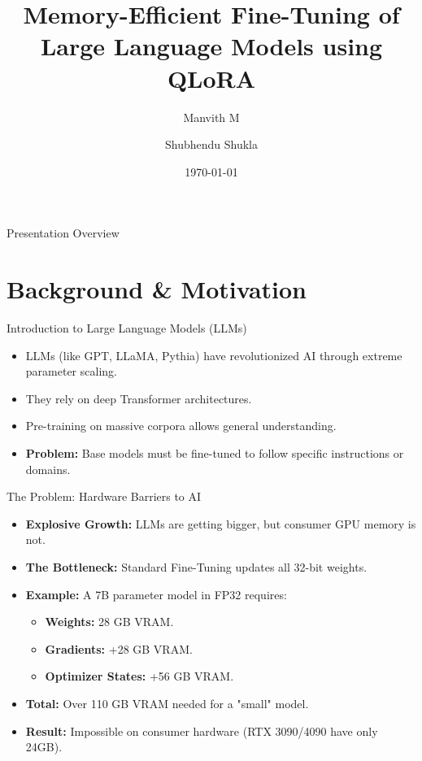 \documentclass[aspectratio=169]{beamer}
\title[Memory-Efficient LLM Fine-Tuning]{Memory-Efficient Fine-Tuning of Large Language Models using QLoRA}
\subtitle{}
\author{Manvith M \and Shubhendu Shukla}
\date{\today}
\begin{document}
\begin{frame}
    \titlepage
\end{frame}

\begin{frame}{Presentation Overview}
    \tableofcontents[hideallsubsections]
\end{frame}

\section{Background \& Motivation}

\begin{frame}{Introduction to Large Language Models (LLMs)}
    \begin{itemize}
        \item LLMs (like GPT, LLaMA, Pythia) have revolutionized AI through extreme parameter scaling.
        \item They rely on deep Transformer architectures.
        \item Pre-training on massive corpora allows general understanding.
        \item \textbf{Problem:} Base models must be fine-tuned to follow specific instructions or domains.
    \end{itemize}
\end{frame}

\begin{frame}{The Problem: Hardware Barriers to AI}
    \begin{itemize}
        \item \textbf{Explosive Growth:} LLMs are getting bigger, but consumer GPU memory is not.
        \item \textbf{The Bottleneck:} Standard Fine-Tuning updates all 32-bit weights.
        \item \textbf{Example:} A 7B parameter model in FP32 requires:
        \begin{itemize}
            \item \textbf{Weights:} 28 GB VRAM.
            \item \textbf{Gradients:} +28 GB VRAM.
            \item \textbf{Optimizer States:} +56 GB VRAM.
        \end{itemize}
        \item \textbf{Total:} Over 110 GB VRAM needed for a "small" model.
        \item \textbf{Result:} Impossible on consumer hardware (RTX 3090/4090 have only 24GB).
    \end{itemize}
\end{frame}
\end{document}
